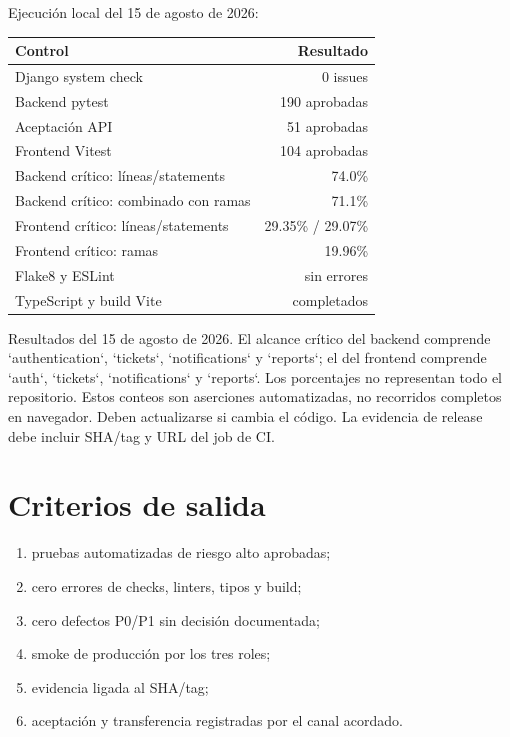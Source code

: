 Ejecución local del 15 de agosto de 2026:

\begin{center}
\begin{tabular}{@{}lr@{}}
\toprule
\textbf{Control} & \textbf{Resultado}\\
\midrule
Django system check & 0 issues\\
Backend pytest & 190 aprobadas\\
Aceptación API & 51 aprobadas\\
Frontend Vitest & 104 aprobadas\\
Backend crítico: líneas/statements & 74.0\%\\
Backend crítico: combinado con ramas & 71.1\%\\
Frontend crítico: líneas/statements & 29.35\% / 29.07\%\\
Frontend crítico: ramas & 19.96\%\\
Flake8 y ESLint & sin errores\\
TypeScript y build Vite & completados\\
\bottomrule
\end{tabular}
\end{center}

Resultados del 15 de agosto de 2026. El alcance crítico del backend comprende `authentication`,
`tickets`, `notifications` y `reports`; el del frontend comprende `auth`, `tickets`, `notifications`
y `reports`. Los porcentajes no representan todo el repositorio. Estos conteos son aserciones
automatizadas, no recorridos completos en navegador. Deben actualizarse si cambia el código. La
evidencia de release debe incluir SHA/tag y URL del job de CI.

\section{Criterios de salida}

\begin{enumerate}
  \item pruebas automatizadas de riesgo alto aprobadas;
  \item cero errores de checks, linters, tipos y build;
  \item cero defectos P0/P1 sin decisión documentada;
  \item smoke de producción por los tres roles;
  \item evidencia ligada al SHA/tag;
  \item aceptación y transferencia registradas por el canal acordado.
\end{enumerate}


